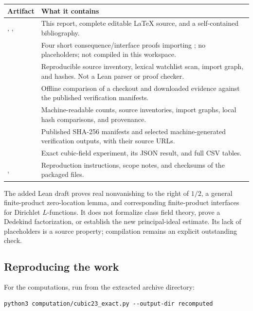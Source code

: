 \begin{longtable}{@{}P{0.39\textwidth}P{0.55\textwidth}@{}}
\toprule
Artifact & What it contains\\
\midrule
\endhead
{}, ,  & This report, complete editable LaTeX source, and a self-contained bibliography.\\
\addlinespace
{} & Four short consequence/interface proofs importing ; no placeholders; not compiled in this workspace.\\
\addlinespace
{} & Reproducible source inventory, lexical watchlist scan, import graph, and hashes. Not a Lean parser or proof checker.\\
\addlinespace
{} & Offline comparison of a checkout and downloaded evidence against the published verification manifests.\\
\addlinespace
{} & Machine-readable counts, source inventories, import graphs, local hash comparisons, and provenance.\\
\addlinespace
{} & Published SHA-256 manifests and selected machine-generated verification outputs, with their source URLs.\\
\addlinespace
{} & Exact cubic-field experiment, its JSON result, and full CSV tables.\\
\addlinespace
{},  & Reproduction instructions, scope notes, and checksums of the packaged files.\\
\bottomrule
\end{longtable}

The added Lean draft proves real nonvanishing to the right of \(1/2\), a general finite-product zero-location lemma, and corresponding finite-product interfaces for Dirichlet \(L\)-functions. It does not formalize class field theory, prove a Dedekind factorization, or establish the new principal-ideal estimate. Its lack of placeholders is a source property; compilation remains an explicit outstanding check.

\subsection{Reproducing the work}

For the computations, run from the extracted archive directory:
\begin{verbatim}
python3 computation/cubic23_exact.py --output-dir recomputed
\end{verbatim}

